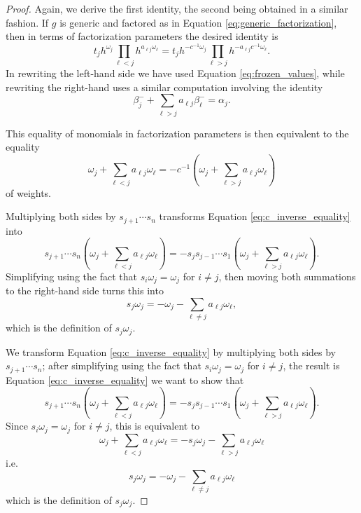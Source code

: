\documentclass[12pt]{amsart}
\theoremstyle{remark}
\numberwithin{equation}{section}
\begin{document}
\begin{proof}
Again, we derive the first identity, the second being obtained in a similar fashion. If $g$ is generic and factored as in Equation \ref{eq:generic_factorization}, then in terms of factorization parameters the desired identity is
\begin{equation}
t_j
    h^{\omega_j}
    \prod_{\ell<j}h^{a_{\ell j}\omega_\ell} = 
t_j
    h^{-c^{-1}\omega_j}
    \prod_{\ell>j}h^{-a_{\ell j}c^{-1}\omega_\ell}.
\end{equation}
In rewriting the left-hand side we have used Equation \ref{eq:frozen_values}, while rewriting the right-hand uses a similar computation involving the identity
\[
    \beta_j^-+\sum_{\ell>j}a_{\ell j}\beta_\ell^-
    =
    \alpha_j.
\]

  This equality of monomials in factorization parameters is then equivalent to the equality
  \begin{equation}\label{eq:c_inverse_equality}
    \omega_j + \sum_{\ell<j} a_{\ell j}\omega_\ell
    =
    -c^{-1}\left(\omega_j + \sum_{\ell>j} a_{\ell j}\omega_\ell\right)
  \end{equation}
of weights. 
  
Multiplying both sides by $s_{j+1}\cdots s_n$ transforms Equation \ref{eq:c_inverse_equality} into
  \[
    s_{j+1}\cdots s_n\left(\omega_j + \sum_{\ell<j} a_{\ell j}\omega_\ell\right)=
    -s_js_{j-1}\cdots s_1\left(\omega_j + \sum_{\ell>j} a_{\ell j}\omega_\ell\right).
  \]
Simplifying using the fact that $s_i\omega_j=\omega_j$ for $i\neq j$, then moving both summations to the right-hand side turns this into
  \begin{equation}
    s_j\omega_j
    =
    -\omega_j-\sum_{\ell\neq j}a_{\ell j}\omega_\ell,
  \end{equation}
  which is the definition of $s_j\omega_j$.

  We transform Equation \ref{eq:c_inverse_equality} by multiplying both sides by $s_{j+1}\cdots s_n$; after simplifying using the fact that  $s_i\omega_j=\omega_j$ for $i\neq j$, the result is
Equation \ref{eq:c_inverse_equality}
we want to show that
  \[
    s_{j+1}\cdots s_n\left(\omega_j + \sum_{\ell<j} a_{\ell j}\omega_\ell\right)=
    -s_js_{j-1}\cdots s_1\left(\omega_j + \sum_{\ell>j} a_{\ell j}\omega_\ell\right).
  \]
  Since $s_i\omega_j=\omega_j$ for $i\neq j$, this is equivalent to
  \[
    \omega_j + \sum_{\ell<j} a_{\ell j}\omega_\ell
    =
    -s_j\omega_j-\sum_{\ell>j} a_{\ell j}\omega_\ell
  \]
  i.e. 
  \begin{equation}
    s_j\omega_j
    =
    -\omega_j-\sum_{\ell\neq j}a_{\ell j}\omega_\ell
  \end{equation}
  which is the definition of $s_j\omega_j$.
\end{proof}
\end{document}

